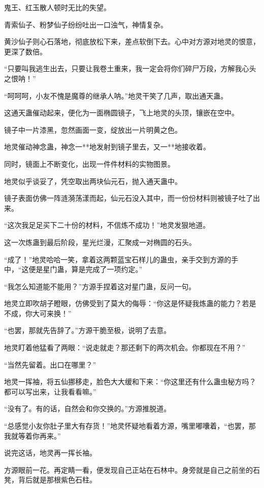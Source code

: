 
\begin{this_body}

鬼王、红玉散人顿时无比的失望。

青索仙子、粉梦仙子纷纷吐出一口浊气，神情复杂。

黄沙仙子则心石落地，彻底放松下来，差点软倒下去。心中对方源对地灵的恨意，更深了数倍。

“只要叫我逃生出去，只要让我卷土重来，我一定会将你们碎尸万段，方解我心头之恨呐！”

“呵呵呵，小友不愧是魔尊的继承人呐。”地灵干笑了几声，取出通天蛊。

这通天蛊催动起来，便化为一面椭圆镜子，飞上地灵的头顶，镶嵌在空中。

镜子中一片漆黑，忽然画面一变，绽放出一片明黄之色。

地灵催动神念蛊，神念一**地发射到镜子里去，又一**地接收着。

同时，镜面上不断变化，出现一件件材料的实物图景。

地灵似乎谈妥了，凭空取出两块仙元石，抛入通天蛊中。

镜子表面仿佛一阵涟漪荡漾而起，仙元石没入其中，而一份份材料则被镜子吐了出来。

“这次我足足买下二十份的材料，不信炼不成功！”地灵发狠地道。

这一次炼蛊到最后阶段，星光烂漫，汇聚成一对椭圆的石头。

“成了！”地灵哈哈一笑，拿着这两颗蓝宝石样儿的蛊虫，亲手交到方源的手中，“这便是星门蛊，算是完成了一项约定。”

“我怎么知道能不能用？”方源手捏着这对星门蛊，反问一句。

地灵立即吹胡子瞪眼，仿佛受到了莫大的侮辱：“你这是怀疑我炼蛊的能力？若是不成，你大可来换！”

“也罢，那就先告辞了。”方源干脆至极，说明了去意。

地灵盯着他猛看了两眼：“说走就走？那还剩下的两次机会。你都现在不用？”

“当然先留着。出口在哪里？”

地灵一挥袖，将五仙挪移走，脸色大大缓和下来：“你这里还有什么蛊虫秘方吗？都可以写出来，让我看看嘛。”

“没有了。有的话，自然会和你交换的。”方源推脱道。

“总感觉小友你肚子里大有存货！”地灵怀疑地看着方源，嘴里嘟囔着，“也罢，那我就等着你再来。”

说完这话，地灵再一挥长袖。

方源眼前一花。再定睛一看，便发现自己正站在石林中。身旁就是自己之前坐的石凳，背后就是那根紫色石柱。


\end{this_body}
